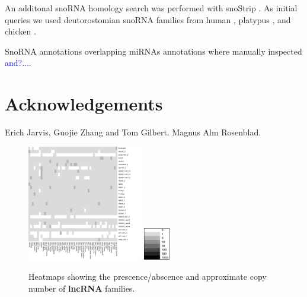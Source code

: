 \documentclass[10pt]{bmc_article}
\newcommand {\ppg}[1]{\textcolor{blue}{#1}}
\newenvironment{bmcformat}{\begin{raggedright}\baselineskip20pt\sloppy\setboolean{publ}{false}}{\end{raggedright}\baselineskip20pt\sloppy}
\begin{document}
\begin{bmcformat}
An additonal snoRNA homology search was performed with snoStrip
\cite{Bartschat:2013}. As initial queries we used deutorostomian
snoRNA families from human \cite{Lestrade:2006}, platypus
\cite{Schmitz:2008}, and chicken \cite{Shao:2009}.

SnoRNA annotations overlapping miRNAs annotations where manually
inspected \ppg{and?...}.




\section*{Acknowledgements}

Erich Jarvis, Guojie Zhang and Tom Gilbert. Magnus Alm Rosenblad. 


{
  } %


\clearpage
\newpage


\begin{figure}[ht]
  \includegraphics[width=0.45\textwidth]{figures/lncRNA.pdf}
  \includegraphics[width=0.1\textwidth]{figures/key2.pdf}
  \caption[]{Heatmaps showing the prescence/abscence and approximate
    copy number of {\bf lncRNA} families.}\label{fig:5}
\end{figure}



\end{bmcformat}
\end{document}
